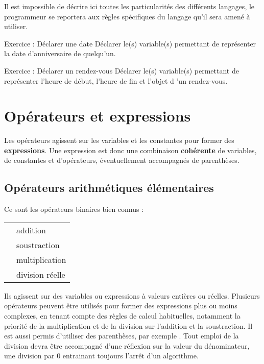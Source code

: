 			Il est impossible de décrire ici toutes les particularités des
			différents langages, le programmeur se reportera aux règles spécifiques
			du langage qu’il sera amené à utiliser.

			
			\begin{Emphase}[exercice]{Exercice : Déclarer une date}
				Déclarer le(s) variable(s) permettant de représenter la date
				d'anniversaire de quelqu'un.
			\end{Emphase}
			
			
			\begin{Emphase}[exercice]{Exercice : Déclarer un rendez-vous}
				Déclarer le(s) variable(s) permettant de représenter
				l'heure de début, l'heure de fin et
				l'objet d 'un rendez-vous.
			\end{Emphase}

	\section{Opérateurs et expressions}
	
		Les opérateurs agissent sur les variables et les constantes pour former
		des \textbf{expressions}. Une expression est donc une combinaison
		\textbf{cohérente} de variables, de constantes et d’opérateurs,
		éventuellement accompagnés de parenthèses.
	
		\subsection{Opérateurs arithmétiques élémentaires}
	
			Ce sont les opérateurs binaires bien connus :
	
			\begin{center}
			\tablehead{}
			\begin{supertabular}{m{1cm}|m{12cm}}
			\raggedleft  \textstyleCodeInsr{+} & addition\\
			\raggedleft  \textstyleCodeInsr{-} & soustraction\\
			\raggedleft  \textstyleCodeInsr{*} & multiplication\\
			\raggedleft  \textstyleCodeInsr{/} & division réelle\\
			\end{supertabular}
			\end{center}
	
			Ils agissent sur des variables ou expressions à valeurs entières ou
			réelles. Plusieurs opérateurs peuvent être utilisés pour former des
			expressions plus ou moins complexes, en tenant compte des règles de
			calcul habituelles, notamment la priorité de la multiplication et de la
			division sur l’addition et la soustraction. Il est aussi permis
			d’utiliser des parenthèses, par exemple . Tout emploi de la division devra être accompagné d’une réflexion
			sur la valeur du dénominateur, une division par 0 entrainant toujours
			l’arrêt d’un algorithme.
	
